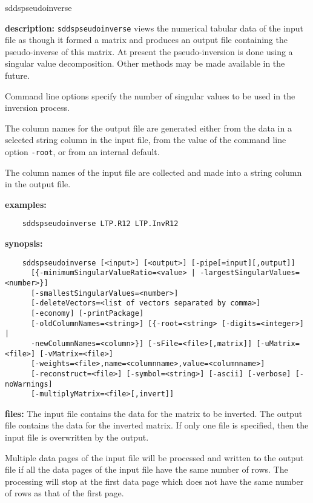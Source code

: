 \begin{sddsprog}{sddspseudoinverse}
  \item {\bf description:} \verb|sddspseudoinverse| views the numerical tabular data of the input file as though it formed a matrix and produces an output file containing the pseudo-inverse of this matrix. At present the pseudo-inversion is done using a singular value decomposition. Other methods may be made available in the future.

  Command line options specify the number of singular values to be used in the inversion process.

  The column names for the output file are generated either from the data in a selected string column in the input file, from the value of the command line option \verb|-root|, or from an internal default.

  The column names of the input file are collected and made into a string column in the output file.

  \item {\bf examples:}
    \begin{verbatim}
    sddspseudoinverse LTP.R12 LTP.InvR12
    \end{verbatim}
  \item {\bf synopsis:}
    \begin{verbatim}
    sddspseudoinverse [<input>] [<output>] [-pipe[=input][,output]]
      [{-minimumSingularValueRatio=<value> | -largestSingularValues=<number>}]
      [-smallestSingularValues=<number>]
      [-deleteVectors=<list of vectors separated by comma>]
      [-economy] [-printPackage]
      [-oldColumnNames=<string>] [{-root=<string> [-digits=<integer>] |
      -newColumnNames=<column>}] [-sFile=<file>[,matrix]] [-uMatrix=<file>] [-vMatrix=<file>]
      [-weights=<file>,name=<columnname>,value=<columnname>]
      [-reconstruct=<file>] [-symbol=<string>] [-ascii] [-verbose] [-noWarnings]
      [-multiplyMatrix=<file>[,invert]]
    \end{verbatim}
  \item {\bf files:}
    The input file contains the data for the matrix to be inverted. The output file contains the data for the inverted matrix. If only one file is specified, then the input file is overwritten by the output.

    Multiple data pages of the input file will be processed and written to the output file if all the data pages of the input file have the same number of rows. The processing will stop at the first data page which does not have the same number of rows as that of the first page.


\end{sddsprog}
